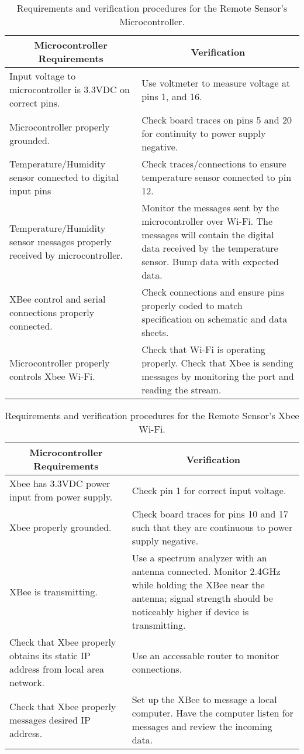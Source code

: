 \begin{table}[htbp]
\begin{tabular}{|p{}|p{}|}
\hline
\multicolumn{1}{|c|}{Microcontroller Requirements} & \multicolumn{1}{|c|}{Verification} \\
\hline\hline
Input voltage to microcontroller is 3.3VDC on correct pins.  & Use voltmeter to measure voltage at pins 1, and 16. \\
\hline
Microcontroller properly grounded. & Check board traces on pins 5 and 20 for continuity to power supply negative. \\
\hline
Temperature/Humidity sensor connected to digital input pins & Check traces/connections to ensure temperature sensor connected to pin 12. \\
\hline
Temperature/Humidity sensor messages properly received by microcontroller. & Monitor the messages sent by the microcontroller over Wi-Fi.  The messages will contain the digital data received by the temperature sensor. Bump data with expected data.\\
\hline
XBee control and serial connections properly connected. & Check connections and ensure pins properly coded to match specification on schematic and data sheets.\\
\hline
Microcontroller properly controls Xbee Wi-Fi. & Check that Wi-Fi is operating properly. Check that Xbee is sending messages by monitoring the port and reading the stream.\\
\hline
\end{tabular}
\caption{Requirements and verification procedures for the Remote Sensor's Microcontroller.}
\label{tab:microcontrollerreq}
\end{table}

\begin{table}[htbp]
\begin{tabular}{|p{}|p{}|}
\hline
\multicolumn{1}{|c|}{Microcontroller Requirements} & \multicolumn{1}{|c|}{Verification} \\
\hline\hline
Xbee has 3.3VDC power input from power supply. & Check pin 1 for correct input voltage.\\
\hline
Xbee properly grounded. & Check board traces for pins 10 and 17 such that they are continuous to power supply negative. \\
\hline
XBee is transmitting. & Use a spectrum analyzer with an antenna connected. Monitor 2.4GHz while holding the XBee near the antenna; signal strength should be noticeably higher if device is transmitting.\\
\hline
Check that Xbee properly obtains its static IP address from local area network. & Use an accessable router to monitor connections.\\
\hline
Check that Xbee properly messages desired IP address. & Set up the XBee to message a local computer.  Have the computer listen for messages and review the incoming data.\\
\hline
\end{tabular}
\caption{Requirements and verification procedures for the Remote Sensor's Xbee Wi-Fi.}
\label{tab:xbeereq}
\end{table}